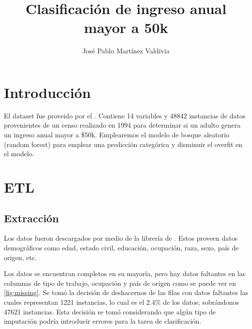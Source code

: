 \documentclass[twocolumn]{article}
\title{Clasificación de ingreso anual mayor a 50k}
\author{José Pablo Martínez Valdivia}
\begin{document}


\section{Introducción}
El dataset  fue proveido por el .
Contiene 14 variables y 48842 instancias de datos provenientes de un censo realizado
en 1994 para determinar si un adulto genera un ingreso anual mayor a \$50k.
Emplearemos el modelo de bosque aleatorio (random forest) para emplear una predicción 
categórica y disminuir el overfit en el modelo.

\section{ETL}
\subsection{Extracción}
Los datos fueron descargados por medio de la librería de .
Estos proveen datos demográficos como edad, estado civil, educación, ocupación, raza,
sexo, país de origen, etc.

Los datos se encuentran completos en su mayoría, pero hay datos faltantes en 
las columnas de tipo de trabajo, ocupación y país de origen como se puede ver en
\ref{fig:missing}. Se tomó la decisión de deshacernos de las filas con datos faltantes
las cuales representan 1221 instancias, lo cual es el 2.4\% de los datos; sobrándonos
47621 instancias. Esta decisión se tomó considerando que algún tipo de imputación  
podría introducir errores para la tarea de clasificación.
\end{document}
